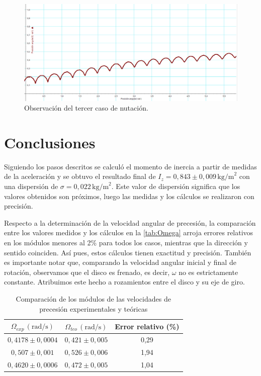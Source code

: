 \documentclass[a4paper]{article}
\begin{document}
\begin{figure}[H]
\begin{center}
\includegraphics[width=12 cm]{nuta3.png}
\caption{Observación del tercer caso de nutación.}
\label{fig:nuta3}
\end{center}
\end{figure}

\section{Conclusiones}
Siguiendo los pasos descritos se calculó el momento de inercia a partir de medidas de la aceleración y se obtuvo el resultado final de $I_z=0,843\pm 0,009\,\text{kg/m}^2$ con una dispersión de $\sigma=0,022\,\text{kg/m}^2$. Este valor de dispersión significa que los valores obtenidos son próximos, luego las medidas y los cálculos se realizaron con precisión.

Respecto a la determinación de la velocidad angular de precesión, la comparación entre los valores medidos y los cálculos en la \autoref{tab:Omega} arroja errores relativos en los módulos menores al 2\% para todos los casos, mientras que la dirección y sentido coinciden. Así pues, estos cálculos tienen exactitud y precisión. También es importante notar que, comparando la velocidad angular inicial y final de rotación, observamos que el disco es frenado, es decir, $\omega$ no es estrictamente constante. Atribuimos este hecho a rozamientos entre el disco y su eje de giro.

\begin{table}[H]
\begin{center}
\begin{tabular}{|c|c|c|}
\hline
$\Omega_{exp}\,\left(\text{rad/s}\right)$ & $\Omega_{teo}\,\left(\text{rad/s}\right)$ & Error relativo (\%)\\
\hline
$0,4178\pm 0,0004$ & $0,421\pm 0,005$ & 0,29 \\
\hline
$0,507\pm 0,001$ & $0,526\pm 0,006$ & 1,94\\
\hline
$0,4620\pm 0,0006$ & $0,472\pm 0,005$ & 1,04\\
\hline
\end{tabular}
\caption{Comparación de los módulos de las velocidades de precesión experimentales y teóricas}
\label{tab:Omega}
\end{center}
\end{table}
\end{document}
